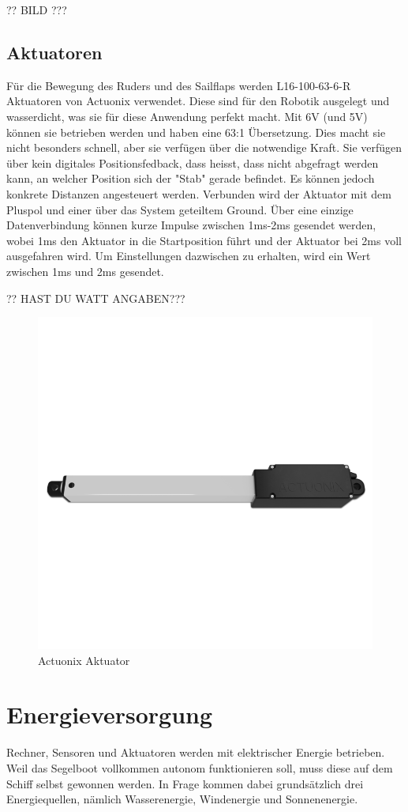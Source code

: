 ?? BILD ???


\subsection{Aktuatoren}
Für die Bewegung des Ruders und des Sailflaps werden L16-100-63-6-R Aktuatoren von Actuonix verwendet. Diese sind für den Robotik ausgelegt und wasserdicht, was sie für diese Anwendung perfekt macht. Mit 6V (und 5V) können sie betrieben werden und haben eine 63:1 Übersetzung. Dies macht sie nicht besonders schnell, aber sie verfügen über die notwendige Kraft.
Sie verfügen über kein digitales Positionsfedback, dass heisst, dass nicht abgefragt werden kann, an welcher Position sich der "Stab" gerade befindet. Es können jedoch konkrete Distanzen angesteuert werden. Verbunden wird der Aktuator mit dem Pluspol und einer über das System geteiltem Ground. Über eine einzige Datenverbindung können kurze Impulse zwischen 1ms-2ms gesendet werden, wobei 1ms den Aktuator in die Startposition führt und der Aktuator bei 2ms voll ausgefahren wird. Um Einstellungen dazwischen zu erhalten, wird ein Wert zwischen 1ms und 2ms gesendet.  


?? HAST DU WATT ANGABEN???
\begin{figure}[H] 
    \centering
    \includegraphics[width=0.5\linewidth]{actuonix.png}
    \caption{Actuonix Aktuator}
    \label{fig:actuator}
\end{figure}

\section{Energieversorgung}

Rechner, Sensoren und Aktuatoren werden mit elektrischer Energie betrieben. Weil das Segelboot vollkommen autonom funktionieren soll, muss diese auf dem Schiff selbst gewonnen werden. In Frage kommen dabei grundsätzlich drei Energiequellen, nämlich Wasserenergie, Windenergie und Sonnenenergie. 

